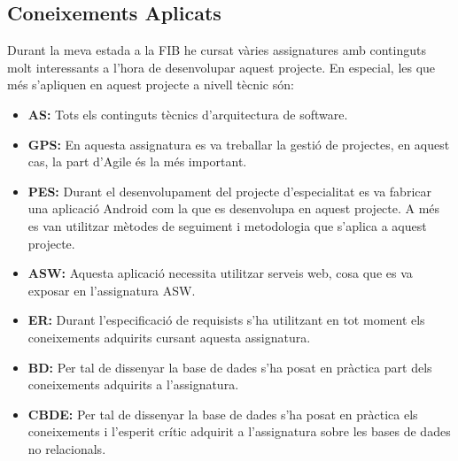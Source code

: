 \subsection{Coneixements Aplicats}
Durant la meva estada a la FIB he cursat vàries assignatures amb continguts molt interessants a l’hora de desenvolupar aquest projecte. En especial, les que més s’apliquen en aquest projecte a nivell tècnic són:
\begin{itemize}
\item{}\textbf{AS:} Tots els continguts tècnics d’arquitectura de software.
\item{}\textbf{GPS:} En aquesta assignatura es va treballar la gestió de projectes, en aquest cas, la part d’Agile és la més important.
\item{}\textbf{PES:} Durant el desenvolupament del projecte d’especialitat es va fabricar una aplicació Android com la que es desenvolupa en aquest projecte. A més es van utilitzar mètodes de seguiment i metodologia que s’aplica a aquest projecte.
\item{}\textbf{ASW:} Aquesta aplicació necessita utilitzar serveis web, cosa que es va exposar en l’assignatura ASW.
\item{}\textbf{ER:} Durant l’especificació de requisists s’ha utilitzant en tot moment els coneixements adquirits cursant aquesta assignatura.
\item{}\textbf{BD:} Per tal de dissenyar la base de dades s’ha posat en pràctica part dels coneixements adquirits a l’assignatura.
\item{}\textbf{CBDE:} Per tal de dissenyar la base de dades s’ha posat en pràctica els coneixements i l’esperit crític adquirit a l’assignatura sobre les bases de dades no relacionals.

\end{itemize}
